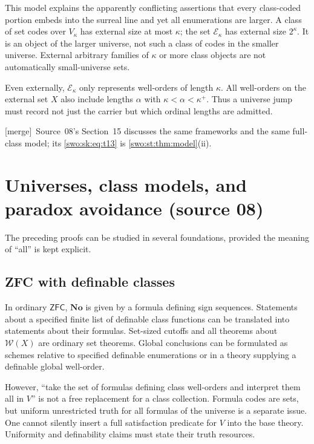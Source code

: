 \documentclass[11pt]{article}
\theoremstyle{definition}
\theoremstyle{remark}
\newcommand{\No}{\mathbf{No}}
\newcommand{\W}{\mathcal W}
\newcommand{\ZFC}{\mathsf{ZFC}}
\newcommand{\merge}{\textsf{[merge]}}
\begin{document}
This model explains the apparently conflicting assertions that every
class-coded portion embeds into the surreal line and yet all enumerations
are larger. A class of set codes over $V_\kappa$ has external size at
most $\kappa$; the set $\mathcal E_\kappa$ has external size $2^\kappa$.
It is an object of the larger universe, not such a class of codes in the
smaller universe. External arbitrary families of $\kappa$ or more class
objects are not automatically small-universe sets.

Even externally, $\mathcal E_\kappa$ only represents well-orders of
length $\kappa$. All well-orders on the external set $X$ also include
lengths $\alpha$ with $\kappa<\alpha<\kappa^+$. Thus a universe jump must
record not just the carrier but which ordinal lengths are admitted.


\merge\ Source~08's Section~15 discusses the same frameworks and the same
full-class model; its \eqref{swo:sk:eq:t13} is \cref{swo:st:thm:model}(ii).

\section{Universes, class models, and paradox avoidance (source 08)}\label{swo:sk:sec:universes}

The preceding proofs can be studied in several foundations, provided
the meaning of ``all'' is kept explicit.

\subsection{ZFC with definable classes}

In ordinary $\ZFC$, $\No$ is given by a formula defining sign sequences.
Statements about a specified finite list of definable class functions
can be translated into statements about their formulas. Set-sized
cutoffs and all theorems about $\W(X)$ are ordinary set theorems.
Global conclusions can be formulated as schemes relative to specified
definable enumerations or in a theory supplying a definable global
well-order.

However, ``take the set of formulas defining class well-orders and
interpret them all in $V$'' is not a free replacement for a class
collection. Formula codes are sets, but uniform unrestricted truth for
all formulas of the universe is a separate issue. One cannot silently
insert a full satisfaction predicate for $V$ into the base theory.
Uniformity and definability claims must state their truth resources.
\end{document}
